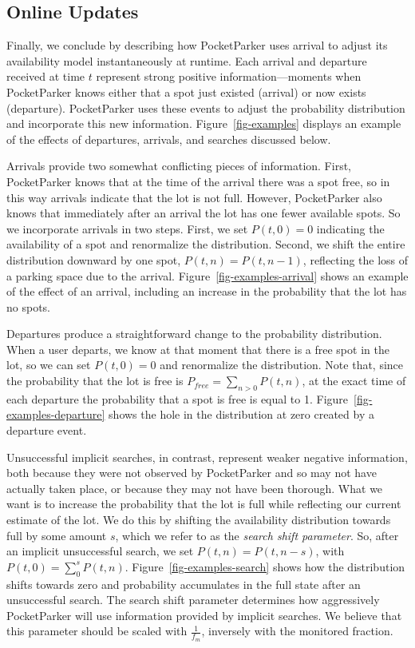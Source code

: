 \subsection{Online Updates}
\label{subsec-online}

Finally, we conclude by describing how PocketParker uses arrival to adjust
its availability model instantaneously at runtime. Each arrival and departure
received at time $t$ represent strong positive information---moments when
PocketParker knows either that a spot just existed (arrival) or now exists
(departure). PocketParker uses these events to adjust the probability
distribution and incorporate this new information. Figure~\ref{fig-examples}
displays an example of the effects of departures, arrivals, and searches
discussed below.

Arrivals provide two somewhat conflicting pieces of information. First,
PocketParker knows that at the time of the arrival there was a spot free, so
in this way arrivals indicate that the lot is not full. However, PocketParker
also knows that immediately after an arrival the lot has one fewer available
spots. So we incorporate arrivals in two steps. First, we set $P(t, 0) = 0$
indicating the availability of a spot and renormalize the distribution.
Second, we shift the entire distribution downward by one spot, $P(t, n) =
P(t, n - 1)$, reflecting the loss of a parking space due to the arrival.
Figure~\ref{fig-examples-arrival} shows an example of the effect of an
arrival, including an increase in the probability that the lot has no spots.

Departures produce a straightforward change to the probability distribution.
When a user departs, we know at that moment that there is a free spot in the
lot, so we can set $P(t, 0) = 0$ and renormalize the distribution. Note that,
since the probability that the lot is free is $P_{free} = \sum_{n > 0} P(t,
n)$, at the exact time of each departure the probability that a spot is free
is equal to 1. Figure~\ref{fig-examples-departure} shows the hole in the
distribution at zero created by a departure event.

Unsuccessful implicit searches, in contrast, represent weaker negative
information, both because they were not observed by PocketParker and so may
not have actually taken place, or because they may not have been thorough.
What we want is to increase the probability that the lot is full while
reflecting our current estimate of the lot. We do this by shifting the
availability distribution towards full by some amount $s$, which we refer to
as the \textit{search shift parameter}. So, after an implicit unsuccessful
search, we set $P(t, n) = P(t, n - s)$, with $P(t, 0) = \sum_0^s P(t, n)$.
Figure~\ref{fig-examples-search} shows how the distribution shifts towards
zero and probability accumulates in the full state after an unsuccessful
search. The search shift parameter determines how aggressively PocketParker
will use information provided by implicit searches. We believe that this
parameter should be scaled with $\frac{1}{f_m}$, inversely with the monitored
fraction.

